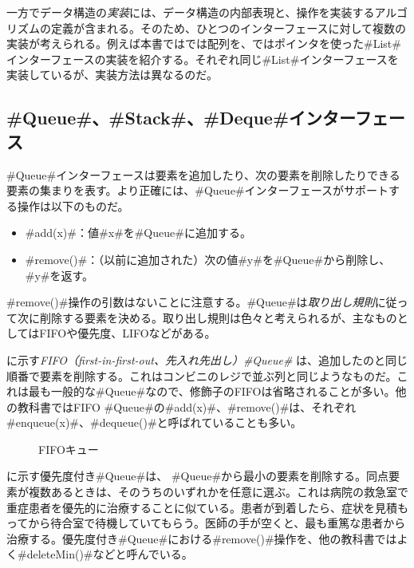 一方でデータ構造の\emph{実装}には、データ構造の内部表現と、操作を実装するアルゴリズムの定義が含まれる。そのため、ひとつのインターフェースに対して複数の実装が考えられる。例えば本書ではでは配列を、ではポインタを使った#List#インターフェースの実装を紹介する。それぞれ同じ#List#インターフェースを実装しているが、実装方法は異なるのだ。

\subsection{#Queue#、#Stack#、#Deque#インターフェース}

#Queue#インターフェースは要素を追加したり、次の要素を削除したりできる要素の集まりを表す。より正確には、#Queue#インターフェースがサポートする操作は以下のものだ。

\begin{itemize}
  \item #add(x)#：値#x#を#Queue#に追加する。
  \item #remove()#：（以前に追加された）次の値#y#を#Queue#から削除し、#y#を返す。
\end{itemize}

#remove()#操作の引数はないことに注意する。#Queue#は\emph{取り出し規則}に従って次に削除する要素を決める。取り出し規則は色々と考えられるが、主なものとしてはFIFOや優先度、LIFOなどがある。 %

に示す\emph{FIFO（first-in-first-out、先入れ先出し）#Queue#} は、追加したのと同じ順番で要素を削除する。これはコンビニのレジで並ぶ列と同じようなものだ。これは最も一般的な#Queue#なので、修飾子のFIFOは省略されることが多い。他の教科書ではFIFO #Queue#の#add(x)#、#remove()#は、それぞれ#enqueue(x)#、#dequeue()#と呼ばれていることも多い。

\begin{figure}
  \caption{FIFOキュー}
\end{figure}

に示す優先度付き#Queue#は、
%
%
%
#Queue#から最小の要素を削除する。同点要素が複数あるときは、そのうちのいずれかを任意に選ぶ。これは病院の救急室で重症患者を優先的に治療することに似ている。患者が到着したら、症状を見積もってから待合室で待機していてもらう。医師の手が空くと、最も重篤な患者から治療する。優先度付き#Queue#における#remove()#操作を、他の教科書ではよく#deleteMin()#などと呼んでいる。 %


